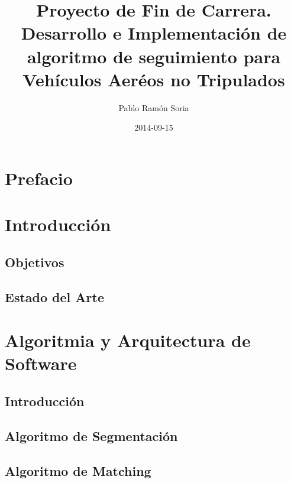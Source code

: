 \documentclass[11pt, oneside]{book} %
\begin{document}
\frontmatter
\title{Proyecto de Fin de Carrera. \\ Desarrollo e Implementación de algoritmo de seguimiento para Vehículos Aeréos no Tripulados}
\author{Pablo Ram\'on Soria}
\date{2014-09-15}
\maketitle

\tableofcontents

\chapter{Prefacio}


\chapter{Introducci\'on}
\section{Objetivos}


\section{Estado del Arte}

\mainmatter

\chapter{Algoritmia y Arquitectura de Software}
\section{Introducci\'on}


\section{Algoritmo de Segmentaci\'on}


\section{Algoritmo de Matching}

\end{document}
